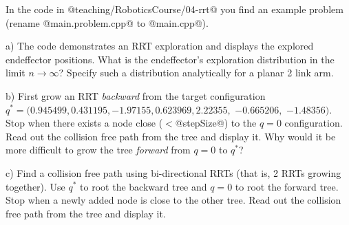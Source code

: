 

\renewcommand{\course}{Robotics}
\renewcommand{\coursepicture}{roboticsLecture}
\renewcommand{\coursedate}{Winter 2014}
\renewcommand{\exnum}{7}

\exercises




In the code in @teaching/RoboticsCourse/04-rrt@
you find an example problem (rename @main.problem.cpp@ to @main.cpp@).

a) The code demonstrates an RRT exploration and displays the explored
endeffector positions. What is the endeffector's exploration
distribution in the limit $n\to\infty$? Specify such a distribution
analytically for a planar 2 link arm.

b) First grow an RRT \emph{backward} from the target configuration
$q^*=(0.945499, 0.431195, -1.97155, 0.623969, 2.22355,$ $-0.665206,$
$-1.48356)$. Stop when there
exists a node close ($<$@stepSize@) to the $q=0$ configuration. Read
out the collision free path from the tree and display it. Why would it
be more difficult to grow the tree \emph{forward} from $q=0$ to $q^*$?

c) Find a collision free path using bi-directional RRTs (that is, 2
RRTs growing together). Use $q^*$ to root the backward tree and $q=0$
to root the forward tree. Stop when a newly added node is close to the
other tree. Read out the collision free path from the tree and
display it.



